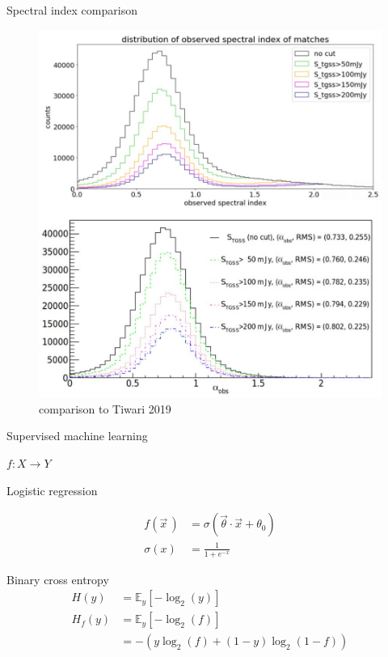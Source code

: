 \documentclass[12pt]{beamer}
\begin{document}
\begin{frame}{Spectral index comparison}
\begin{figure}
    \centering
    \includegraphics[height=0.78\textheight]{pics/hist_alpha_comparison-cropped.pdf}
    \caption{comparison to Tiwari 2019}
\end{figure}
\end{frame}

\begin{frame}{Supervised machine learning}
\centering
{\Huge
$f: X \longrightarrow Y$
\pause
\begin{center}
Logistic regression
\end{center}
\begin{equation*}
\begin{split}
    f(\vec{x}\,) &= \sigma(\vec{\theta}\cdot\vec{x}+\theta_0) \\
    \sigma(x) &= \frac{1}{1+e^{-x}}
\end{split}
\end{equation*}
}
\end{frame}

\begin{frame}{Binary cross entropy}
\Large{
\begin{equation*}
\begin{split}
    H(y) &= \mathbb{E}_y [- \log_2(y)] \\
    H_f(y) &= \mathbb{E}_y [- \log_2(f)]\\
    &= - (y \log_2(f) + (1-y) \log_2(1-f))
\end{split}
\end{equation*}
}%
\end{frame}
\end{document}
